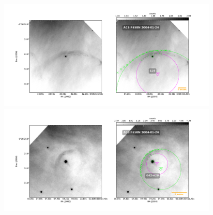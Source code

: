 \begin{figure}
  \centering
  \ContinuedFloat
  \captionsetup{list=off, format=cont}
  \includegraphics[width=\linewidth]{./Figures/LL6-Bally_08-images} \includegraphics[width=\linewidth]{./Figures/042-628-Bally_16-images}  %
  \caption{}
  \label{fig:Luis-mosaic-2}
\end{figure}


